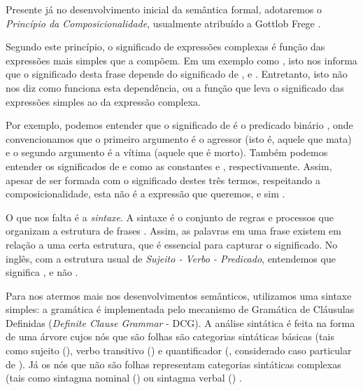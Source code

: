 Presente já no desenvolvimento inicial da semântica formal, adotaremos o \textit{Princípio da Composicionalidade}, usualmente atribuído a Gottlob Frege \citep[p.~94]{BlackburnBos:2005}.

Segundo este princípio, o significado de expressões complexas é função das expressões mais simples que a compõem. Em um exemplo como , isto nos informa que o significado desta frase depende do significado de ,  e . Entretanto, isto não nos diz como funciona esta dependência, ou a função que leva o significado das expressões simples ao da expressão complexa.

Por exemplo, podemos entender que o significado de  é o predicado binário , onde convencionamos que o primeiro argumento é o agressor (isto é, aquele que mata) e o segundo argumento é a vítima (aquele que é morto). Também podemos entender os significados de  e  como as constantes  e , respectivamente. Assim, apesar de  ser formada com o significado destes três termos, respeitando a composicionalidade, esta não é a expressão que queremos, e sim .

O que nos falta é a \textit{sintaxe}. A sintaxe é o conjunto de regras e processos que organizam a estrutura de frases \citep[p.~2]{vanEijck:2010}. Assim, as palavras em uma frase existem em relação a uma certa estrutura, que é essencial para capturar o significado. No inglês, com a estrutura usual de \textit{Sujeito - Verbo - Predicado}, entendemos que  significa , e não .

Para nos atermos mais nos desenvolvimentos semânticos, utilizamos uma sintaxe simples: a gramática é implementada pelo mecanismo de Gramática de Cláusulas Definidas (\textit{Definite Clause Grammar} - DCG). A análise sintática é feita na forma de uma árvore cujos nós que são folhas são categorias sintáticas básicas (tais como sujeito (), verbo transitivo () e quantificador (, considerado caso particular de ). Já os nós que não são folhas representam categorias sintáticas complexas (tais como sintagma nominal () ou sintagma verbal () \cite[p.~58]{BlackburnBos:2005}. %

